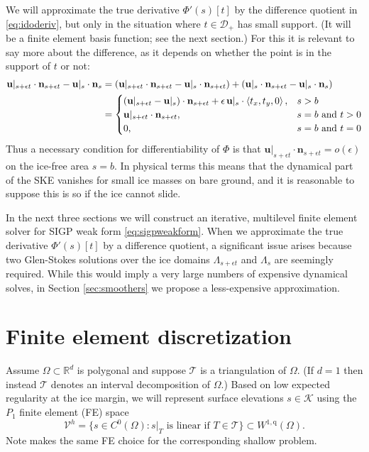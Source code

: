 \documentclass[letterpaper,final,12pt,reqno]{amsart}
\theoremstyle{claim}
\newcommand{\eps}{\epsilon}
\newcommand{\RR}{\mathbb{R}}
\newcommand{\bn}{\mathbf{n}}
\newcommand{\bu}{\mathbf{u}}
\newcommand{\qq}{{\text{q}}}
\numberwithin{equation}{section}
\numberwithin{figure}{section}
\numberwithin{table}{section}
\numberwithin{theorem}{section}
\begin{document}
We will approximate the true derivative $\Phi'(s)[t]$ by the difference quotient in \eqref{eq:idoderiv}, but only in the situation where $t \in \mathcal{D}_+$ has small support.  (It will be a finite element basis function; see the next section.)  For this it is relevant to say more about the difference, as it depends on whether the point is in the support of $t$ or not:
\begin{align}
\bu|_{s+\eps t} \cdot \bn_{s+\eps t} - \bus \cdot \bn_s &= \left(\bu|_{s+\eps t} \cdot \bn_{s+\eps t} - \bus \cdot \bn_{s+\eps t}\right) + \left(\bus \cdot \bn_{s+\eps t} - \bus \cdot \bn_s\right) \label{eq:differencecases} \\
    &= \begin{cases}
           (\bu|_{s+\eps t} - \bus) \cdot \bn_{s+\eps t} + \eps\, \bus \cdot \left<t_x,t_y,0\right>, & s > b \\
           \bu|_{s+\eps t} \cdot \bn_{s+\eps t}, & s=b \text{ and } t > 0 \\
           0, & s=b \text{ and } t = 0
                 \end{cases} \notag
\end{align}
Thus a necessary condition for differentiability of $\Phi$ is that $\bu|_{s+\eps t} \cdot \bn_{s+\eps t} = o(\eps)$ on the ice-free area $s=b$.  In physical terms this means that the dynamical part of the SKE vanishes for small ice masses on bare ground, and it is reasonable to suppose this is so if the ice cannot slide.

In the next three sections we will construct an iterative, multilevel finite element solver for SIGP weak form \eqref{eq:sigpweakform}.  When we approximate the true derivative $\Phi'(s)[t]$ by a difference quotient, a significant issue arises because two Glen-Stokes solutions over the ice domains $\Lambda_{s+\eps t}$ and $\Lambda_s$ are seemingly required.  While this would imply a very large numbers of expensive dynamical solves, in Section \ref{sec:smoothers} we propose a less-expensive approximation.


\section{Finite element discretization} \label{sec:fe}

Assume $\Omega \subset \RR^d$ is polygonal and suppose $\mathcal{T}$ is a triangulation of $\Omega$.  (If $d=1$ then instead $\mathcal{T}$ denotes an interval decomposition of $\Omega$.)  Based on low expected regularity at the ice margin, we will represent surface elevations $s\in \mathcal{K}$ using the $P_1$ finite element (FE) space
\begin{equation}
\mathcal{V}^h = \{s \in C^0(\Omega) : s|_T \text{ is linear if } T \in \mathcal{T}\} \subset W^{1,\qq}(\Omega).
\end{equation}
Note \cite{JouvetBueler2012} makes the same FE choice for the corresponding shallow problem.
\end{document}
